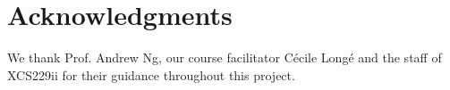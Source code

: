 \section*{Acknowledgments}

We thank Prof. Andrew Ng, our course facilitator Cécile Longé and the staff of XCS229ii for their guidance throughout this project.
